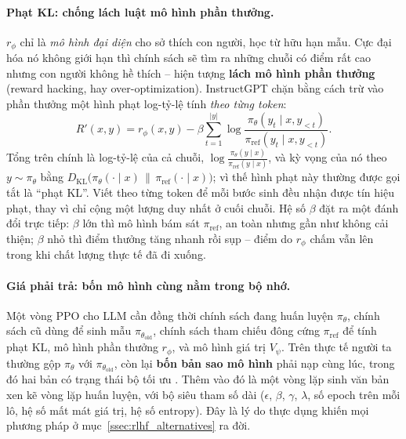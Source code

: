 \paragraph{Phạt KL: chống lách luật mô hình phần thưởng.}
\( r_{\phi} \) chỉ là \emph{mô hình đại diện} cho sở thích con người, học từ hữu hạn mẫu. Cực đại hóa nó không giới hạn thì chính sách sẽ tìm ra những chuỗi có điểm rất cao nhưng con người không hề thích -- hiện tượng \textbf{lách mô hình phần thưởng} (reward hacking, hay over-optimization). InstructGPT \cite{ouyang2022training} chặn bằng cách trừ vào phần thưởng một hình phạt log-tỷ-lệ tính \emph{theo từng token}:
\[
    R'(x, y)
    = r_{\phi}(x, y)
    - \beta \sum_{t=1}^{|y|} \log \frac{
        \pi_{\theta}(y_t \mid x, y_{<t})
    }{
        \pi_{\text{ref}}(y_t \mid x, y_{<t})
    }.
\]
Tổng trên chính là log-tỷ-lệ của cả chuỗi, \( \log \frac{\pi_{\theta}(y \mid x)}{\pi_{\text{ref}}(y \mid x)} \), và kỳ vọng của nó theo \( y \sim \pi_{\theta} \) bằng \( D_{\text{KL}}\big(\pi_{\theta}(\cdot \mid x) \,\big\|\, \pi_{\text{ref}}(\cdot \mid x)\big) \); vì thế hình phạt này thường được gọi tắt là ``phạt KL''. Viết theo từng token để mỗi bước sinh đều nhận được tín hiệu phạt, thay vì chỉ cộng một lượng duy nhất ở cuối chuỗi. Hệ số \( \beta \) đặt ra một đánh đổi trực tiếp: \( \beta \) lớn thì mô hình bám sát \( \pi_{\text{ref}} \), an toàn nhưng gần như không cải thiện; \( \beta \) nhỏ thì điểm thưởng tăng nhanh rồi sụp -- điểm do \( r_{\phi} \) chấm vẫn lên trong khi chất lượng thực tế đã đi xuống.

\paragraph{Giá phải trả: bốn mô hình cùng nằm trong bộ nhớ.}
Một vòng PPO cho LLM cần đồng thời chính sách đang huấn luyện \( \pi_{\theta} \), chính sách cũ dùng để sinh mẫu \( \pi_{\theta_{\text{old}}} \), chính sách tham chiếu đông cứng \( \pi_{\text{ref}} \) để tính phạt KL, mô hình phần thưởng \( r_{\phi} \), và mô hình giá trị \( V_{\psi} \). Trên thực tế người ta thường gộp \( \pi_{\theta} \) với \( \pi_{\theta_{\text{old}}} \), còn lại \textbf{bốn bản sao mô hình} phải nạp cùng lúc, trong đó hai bản có trạng thái bộ tối ưu \cite{ahmadian2024rloo}. Thêm vào đó là một vòng lặp sinh văn bản xen kẽ vòng lặp huấn luyện, với bộ siêu tham số dài (\( \epsilon \), \( \beta \), \( \gamma \), \( \lambda \), số epoch trên mỗi lô, hệ số mất mát giá trị, hệ số entropy). Đây là lý do thực dụng khiến mọi phương pháp ở mục~\ref{ssec:rlhf_alternatives} ra đời.

